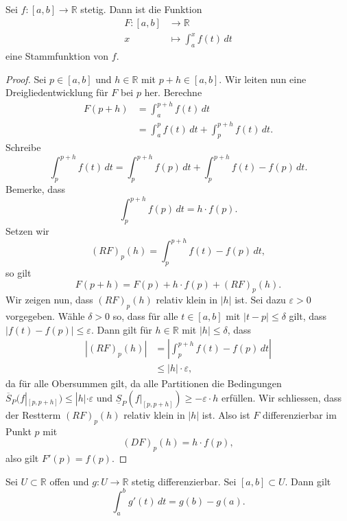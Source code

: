 \documentclass[../main.tex]{subfiles}
\begin{document}
\begin{theorem}\label{thm:fundamental}
  Sei $f \colon [a, b] \to \mathbb{R}$ stetig.
  Dann ist die Funktion
  \begin{align*}
    F \colon [a, b] & \to \mathbb{R} \\
    x & \mapsto \int_{a}^{x} f(t) \, dt
  \end{align*}
  eine Stammfunktion von $f$.
\end{theorem}

\begin{proof}
  Sei $p \in [a, b]$ und $h \in \mathbb{R}$
  mit $p + h \in [a, b]$.
  Wir leiten nun eine Dreigliedentwicklung
  für $F$ bei $p$ her. Berechne
  \begin{align*}
    F(p+h)
    &= \int_{a}^{p+h} f(t) \, dt\\
    &= \int_{a}^{p} f(t) \, dt
    + \int_{p}^{p+h} f(t) \, dt.
  \end{align*}
  Schreibe
  \[
    \int_{p}^{p+h} f(t) \, dt
    = \int_{p}^{p+h} f(p) \, dt
    + \int_{p}^{p+h} f(t) - f(p) \, dt.
  \]
  Bemerke, dass
  \[
    \int_{p}^{p+h} f(p) \, dt = h \cdot f(p).
  \]
  Setzen wir
  \[
    {(RF)}_p(h) = \int_{p}^{p+h} f(t) - f(p) \, dt,
  \]
  so gilt
  \[
    F(p + h) = F(p) + h \cdot f(p) + {(RF)}_p(h).
  \]
  Wir zeigen nun, dass ${(RF)}_p(h)$ relativ klein in $|h|$ ist.
  Sei dazu $\varepsilon > 0$ vorgegeben.
  Wähle $\delta > 0$ so, dass für alle
  $t \in [a, b]$ mit $|t - p| \leq \delta$ gilt,
  dass $|f(t) - f(p)| \leq \varepsilon$.
  Dann gilt für $h \in \mathbb{R}$ mit $|h| \leq \delta$,
  dass
  \begin{align*}
    |{(RF)}_p(h)|
    & = \left| \int_{p}^{p+h} f(t) - f(p) \, dt \right|\\
    & \leq |h| \cdot \varepsilon,
  \end{align*}
  da für alle Obersummen gilt, da alle Partitionen
  die Bedingungen
  $\overline S_P(f|_{[p, p+h]}) \leq |h| \cdot \varepsilon$
  und $\underline S_P(f|_{[p, p+h]}) \geq - \varepsilon \cdot h$
  erfüllen.
  Wir schliessen, dass der Restterm
  ${(RF)}_p(h)$ relativ klein in $|h|$ ist.
  Also ist $F$ differenzierbar im Punkt $p$ mit
  \[
    {(DF)}_p(h) = h \cdot f(p),
  \]
  also gilt $F'(p) = f(p)$.
\end{proof}

\begin{application}
  Sei $U \subset \mathbb{R}$ offen und $g \colon U \to \mathbb{R}$
  stetig differenzierbar. Sei $[a, b] \subset U$.
  Dann gilt
  \[
    \int_{a}^{b} g'(t) \, dt = g(b) - g(a).
  \]
\end{application}
\end{document}
